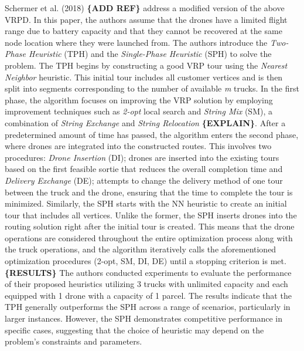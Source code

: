 \documentclass{article}
\begin{document}
	\par 
	Schermer et al. (2018) \textbf{\{ADD REF\}} address a modified version of the above VRPD. In this paper, the authors assume that the drones have a limited flight range due to battery capacity and that they cannot be recovered at the same node location where they were launched from. The authors introduce the \textit{Two-Phase Heuristic} (TPH) and the \textit{Single-Phase Heuristic} (SPH) to solve the problem. The TPH begins by constructing a good VRP tour using the \textit{Nearest Neighbor} heuristic. This initial tour includes all customer vertices and is then split into segments corresponding to the number of available \textit{m} trucks. In the first phase, the algorithm focuses on improving the VRP solution by employing improvement techniques such as \textit{2-opt} local search and \textit{String Mix} (SM), a combination of \textit{String Exchange} and \textit{String Relocation} \textbf{\{EXPLAIN\}}. After a predetermined amount of time has passed, the algorithm enters the second phase, where drones are integrated into the constructed routes. This involves two procedures: \textit{Drone Insertion} (DI); drones are inserted into the existing tours based on the first feasible sortie that reduces the overall completion time and \textit{Delivery Exchange} (DE); attempts to change the delivery method of one tour between the truck and the drone, ensuring that the time to complete the tour is minimized. Similarly, the SPH starts with the NN heuristic to create an initial tour that includes all vertices. Unlike the former, the SPH inserts drones into the routing solution right after the initial tour is created. This means that the drone operations are considered throughout the entire optimization process along with the truck operations, and the algorithm iteratively calls the aforementioned optimization procedures (2-opt, SM, DI, DE) until a stopping criterion is met. \textbf{\{RESULTS\}} The authors conducted experiments to evaluate the performance of their proposed heuristics utilizing 3 trucks with unlimited capacity and each equipped with 1 drone with a capacity of 1 parcel. The results indicate that the TPH generally outperforms the SPH across a range of scenarios, particularly in larger instances. However, the SPH demonstrates competitive performance in specific cases, suggesting that the choice of heuristic may depend on the problem's constraints and parameters.
	\par 
\end{document}
